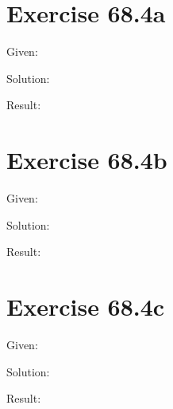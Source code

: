 \documentclass[a4paper, 10pt]{scrartcl}
\begin{document}
\section{Exercise 68.4a}

Given:

Solution:

Result:

\section{Exercise 68.4b}

Given:

Solution:

Result:

\section{Exercise 68.4c}

Given:

Solution:

Result:
\end{document}
